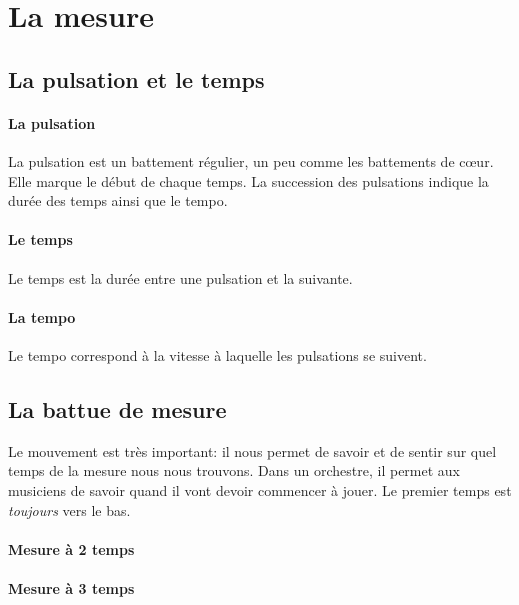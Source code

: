 \chapter{La mesure}

\section{La pulsation et le temps}
\subsubsection{La pulsation}
La pulsation est un battement régulier, un peu comme les battements de c\oe{}ur. Elle marque le début de chaque temps. La succession des pulsations indique la durée des temps ainsi que le tempo.
\subsubsection{Le temps}
Le temps est la durée entre une pulsation et la suivante.
\subsubsection{La tempo}
Le tempo correspond à la vitesse à laquelle les pulsations se suivent.

\section{La battue de mesure}
Le mouvement est très important: il nous permet de savoir et de sentir sur quel temps de la mesure nous nous trouvons. Dans un orchestre, il permet aux musiciens de savoir quand il vont devoir commencer à jouer. Le premier temps est \emph{toujours} vers le bas.

\subsubsection{Mesure à 2 temps}

\subsubsection{Mesure à 3 temps}

